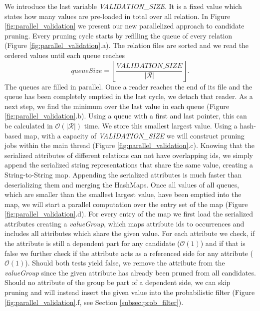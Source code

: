 We introduce the last variable \textit{VALIDATION\_SIZE}. It is a fixed value which states how many values are pre-loaded in total over all relation. In Figure \ref{fig:parallel_validation} we present our new parallelized approach to candidate pruning. Every pruning cycle starts by refilling the queue of every relation (Figure \ref{fig:parallel_validation}.a). The relation files are sorted and we read the ordered values until each queue reaches $$
\textit{queueSize} = \left \lfloor \frac{\textit{VALIDATION\_SIZE}}{|\mathcal{R}|} \right \rfloor. 
$$
The queues are filled in parallel. Once a reader reaches the end of its file and the queue has been completely emptied in the last cycle, we detach that reader. As a next step, we find the minimum over the last value in each queue (Figure \ref{fig:parallel_validation}.b). Using a queue with a first and last pointer, this can be calculated in $\mathcal{O}(|\mathcal{R}|)$ time. We store this smallest largest value. Using a hash-based map, with a capacity of \textit{VALIDATION\_SIZE} we will construct pruning jobs within the main thread (Figure \ref{fig:parallel_validation}.c). Knowing that the serialized attributes of different relations can not have overlapping ids, we simply append the serialized string representations that share the same value, creating a String-to-String map. Appending the serialized attributes is much faster than deserializing them and merging the HashMaps. Once all values of all queues, which are smaller than the smallest largest value, have been emptied into the map, we will start a parallel computation over the entry set of the map (Figure \ref{fig:parallel_validation}.d). For every entry of the map we first load the serialized attributes creating a \textit{valueGroup}, which maps attribute ids to occurrences and includes all attributes which share the given value. For each attribute we check, if the attribute is still a dependent part for any candidate ($\mathcal{O}(1)$) and if that is false we further check if the attribute acts as a referenced side for any attribute ($\mathcal{O}(1)$). Should both tests yield false, we remove the attribute from the \textit{valueGroup} since the given attribute has already been pruned from all candidates. Should no attribute of the group be part of a dependent side, we can skip pruning and will instead insert the given value into the probabilistic filter (Figure \ref{fig:parallel_validation}.f, see Section \ref{subsec:prob_filter}).
